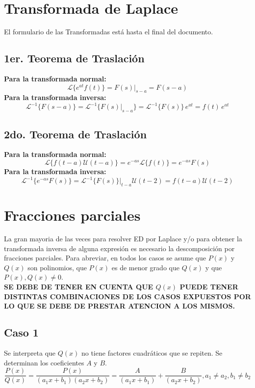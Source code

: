 \documentclass[letterpaper, 12pt]{article}
\newcommand{\Laplace}{\mathscr{L}}
\begin{document}
    \newpage
    \begin{justify}
        \thispagestyle{fancy}
        \section{Transformada de Laplace}
        \justify
        El formulario de las Transformadas está hasta el final del documento.
        \subsection{1er. Teorema de Traslación}
        \justify
        \textbf{Para la transformada normal:}
        {\large\[\Laplace\{e^{at}f(t)\}=F(s)|_{s-a}=F(s-a)\]}
        \justify
        \textbf{Para la transformada inversa:}
        {\large\[\Laplace^{-1}\{F(s-a)\}=\Laplace^{-1}\{F(s)|_{s-a}\}=\Laplace^{-1}\{F(s)\}\, e^{at}=f(t)\, e^{at}\]}
        \subsection{2do. Teorema de Traslación}
        \justify
        \textbf{Para la transformada normal:}
        {\large\[\Laplace\{f(t-a)\mathscr{U}(t-a)\}=e^{-as}\Laplace\{f(t)\}=e^{-as}F(s)\]}
        \justify
        \textbf{Para la transformada inversa:}
        {\large\[\Laplace^{-1}\{e^{-as}F(s)\}=\Laplace^{-1}\{F(s)\}|_{t-a}\mathscr{U}(t-2)=f(t-a)\mathscr{U}(t-2)\]}
        \section{Fracciones parciales}
        \justify
        La gran mayoria de las veces para resolver ED por Laplace y/o para obtener la transformada inversa de alguna expresión es necesario la descomposición
        por fracciones parciales. Para abreviar, en todos los casos se asume que \(P(x)\) y \(Q(x)\) son polinomios, que \(P(x)\) es de menor grado que \(Q(x)\) y
        que \(P(x),Q(x)\neq 0\).
        \\\newline
        \textbf{SE DEBE DE TENER EN CUENTA QUE \(Q(x)\) PUEDE TENER DISTINTAS COMBINACIONES DE LOS CASOS EXPUESTOS POR LO QUE SE DEBE DE PRESTAR ATENCION A LOS MISMOS.}
        \subsection{Caso 1}
        \justify
        Se interpreta que \(Q(x)\) no tiene factores cuadráticos que se repiten. Se determinan los coeficientes \(A\) y \(B\).
        {\large \[\frac{P(x)}{Q(x)}=\frac{P(x)}{(a_1x+b_1)(a_2x+b_2)}=\frac{A}{(a_1x+b_1)}+\frac{B}{(a_2x+b_2)}, a_1\neq a_2, b_1\neq b_2\]}

\end{justify}
\end{document}
